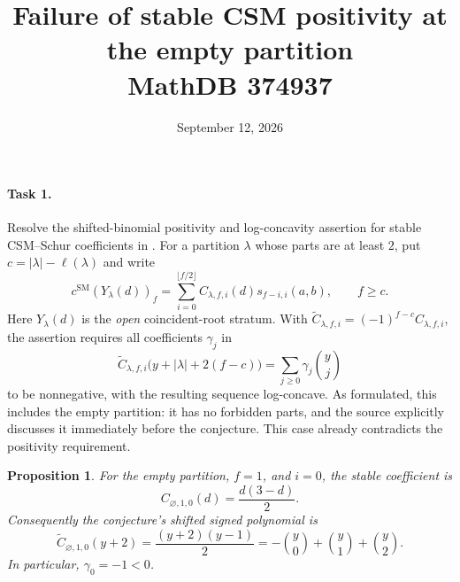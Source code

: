 \documentclass[11pt]{article}
\title{Failure of stable CSM positivity at the empty partition\\
\large MathDB 374937}
\author{}
\date{September 12, 2026}
\newtheorem{proposition}{Proposition}
\newcommand{\cSM}{c^{\mathrm{SM}}}
\begin{document}
\maketitle
\vspace{-2em}

\paragraph{Task 1.}
Resolve the shifted-binomial positivity and log-concavity assertion for
stable CSM--Schur coefficients in \cite[Conjecture 6.7]{BF}.
For a partition $\lambda$ whose parts are at least $2$, put
$c=|\lambda|-\ell(\lambda)$ and write
\[
 \cSM(Y_\lambda(d))_f
 =\sum_{i=0}^{\lfloor f/2\rfloor}
 C_{\lambda,f,i}(d)s_{f-i,i}(a,b),\qquad f\geq c.
\]
Here $Y_\lambda(d)$ is the \emph{open} coincident-root stratum.
With $\widetilde C_{\lambda,f,i}=(-1)^{f-c}C_{\lambda,f,i}$, the
assertion requires all coefficients $\gamma_j$ in
\[
 \widetilde C_{\lambda,f,i}\bigl(y+|\lambda|+2(f-c)\bigr)
       =\sum_{j\geq0}\gamma_j\binom yj
\]
to be nonnegative, with the resulting sequence log-concave.
As formulated, this includes the empty partition: it has no forbidden
parts, and the source explicitly discusses it immediately before the
conjecture. This case already contradicts the positivity requirement.

\begin{proposition}
For the empty partition, $f=1$, and $i=0$, the stable coefficient is
\[
 C_{\varnothing,1,0}(d)=\frac{d(3-d)}2.
\]
Consequently the conjecture's shifted signed polynomial is
\[
 \widetilde C_{\varnothing,1,0}(y+2)
   =\frac{(y+2)(y-1)}2
   =-\binom y0+\binom y1+\binom y2 .
\]
In particular, $\gamma_0=-1<0$.
\end{proposition}
\end{document}
